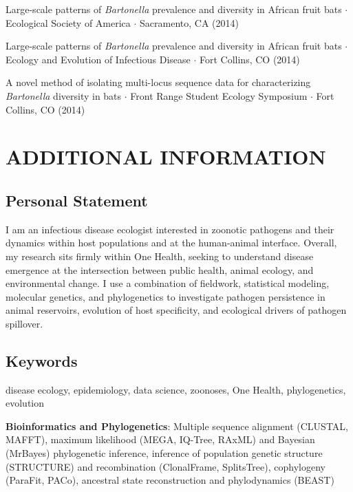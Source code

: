 \documentclass{cv}
\begin{document}
Large-scale patterns of \textit{Bartonella} prevalence and diversity in African fruit bats $\cdot$ Ecological Society of America $\cdot$ Sacramento, CA (2014)

Large-scale patterns of \textit{Bartonella} prevalence and diversity in African fruit bats $\cdot$ Ecology and Evolution of Infectious Disease $\cdot$ Fort Collins, CO (2014)

A novel method of isolating multi-locus sequence data for characterizing \textit{Bartonella} diversity in bats $\cdot$ Front Range Student Ecology Symposium $\cdot$ Fort Collins, CO (2014)


\section*{ADDITIONAL INFORMATION}

\subsection*{Personal Statement}

I am an infectious disease ecologist interested in zoonotic pathogens and their dynamics within host populations and at the human-animal interface. Overall, my research sits firmly within One Health, seeking to understand disease emergence at the intersection between public health, animal ecology, and environmental change. I use a combination of fieldwork, statistical modeling, molecular genetics, and phylogenetics to investigate pathogen persistence in animal reservoirs, evolution of host specificity, and ecological drivers of pathogen spillover.

\subsection*{Keywords}

disease ecology, epidemiology, data science, zoonoses, One Health, phylogenetics, evolution


\textbf{Bioinformatics and Phylogenetics}: Multiple sequence alignment (CLUSTAL, MAFFT), maximum likelihood (MEGA, IQ-Tree, RAxML) and Bayesian (MrBayes) phylogenetic inference, inference of population genetic structure (STRUCTURE) and recombination (ClonalFrame, SplitsTree), cophylogeny (ParaFit, PACo), ancestral state reconstruction and phylodynamics (BEAST)
\end{document}
